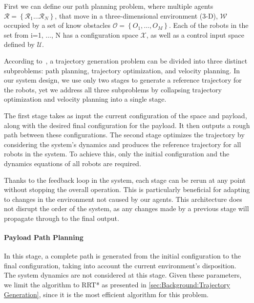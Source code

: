 First we can define our path planning problem, where multiple agents  $\mathcal{R} = \left\{ \mathcal{R}_1 \dots \mathcal{R}_N\right\}$, that move in a three-dimensional environment (3-D), $\mathcal{W}$ occupied by a set of know obstacles $\mathcal{O} = \left\{ O_{1}, \dots, O_{M} \right\}$. Each of the robots in the set from i=1, $\dots$, N has a configuration space $\mathcal{X}$, as well as a control input space defined by $\mathcal{U}$.

According to~\cite{lavalle2006planning}, a trajectory generation problem can be divided into three distinct subproblems: path planning, trajectory optimization, and velocity planning. In our system design, we use only two stages to generate a reference trajectory for the robots, yet we address all three subproblems by collapsing trajectory optimization and velocity planning into a single stage. 

The first stage takes as input the current configuration of the space and payload, along with the desired final configuration for the payload. It then outputs a rough path between these configurations. The second stage optimizes the trajectory by considering the system's dynamics and produces the reference trajectory for all robots in the system. To achieve this, only the initial configuration and the dynamics equations of all robots are required. 

Thanks to the feedback loop in the system, each stage can be rerun at any point without stopping the overall operation. This is particularly beneficial for adapting to changes in the environment not caused by our agents. This architecture does not disrupt the order of the system, as any changes made by a previous stage will propagate through to the final output.

\paragraph{Payload Path Planning} 
In this stage, a complete path is generated from the initial configuration to the final configuration, taking into account the current environment's disposition. The system dynamics are not considered at this stage. Given these parameters, we limit the algorithm to RRT* as presented in \ref{sec:Background:Trajectory Generation}, since it is the most efficient algorithm for this problem.

